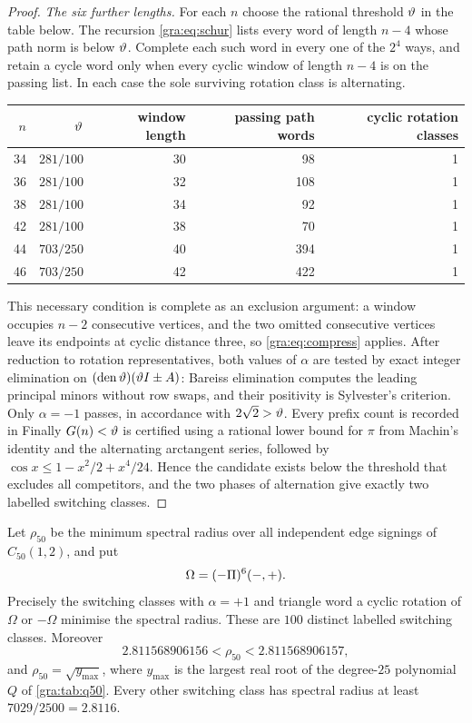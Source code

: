 \begin{proof}
\emph{The six further lengths.} For each $n$ choose the rational
threshold $\vartheta$ in the table below. The recursion
\eqref{gra:eq:schur} lists every word of length $n-4$ whose path norm is
below $\vartheta$. Complete each such word in every one of the $2^4$ ways,
and retain a cycle word only when every cyclic window of length $n-4$ is
on the passing list. In each case the sole surviving rotation class is
alternating.
\begin{center}\small\upshape
\begin{tabular}{rrrrr}
\toprule
$n$&$\vartheta$&window length&passing path words&cyclic rotation classes\\
\midrule
34&$281/100$&30&98&1\\
36&$281/100$&32&108&1\\
38&$281/100$&34&92&1\\
42&$281/100$&38&70&1\\
44&$703/250$&40&394&1\\
46&$703/250$&42&422&1\\
\bottomrule
\end{tabular}
\end{center}
This necessary condition is complete as an exclusion argument: a window
occupies $n-2$ consecutive vertices, and the two omitted consecutive
vertices leave its endpoints at cyclic distance three, so
\eqref{gra:eq:compress} applies. After reduction to rotation
representatives, both values of $\alpha$ are tested by exact integer
elimination on $(\operatorname{den}\vartheta)(\vartheta I\pm A)$: Bareiss
elimination computes the leading principal minors without row swaps, and
their positivity is Sylvester's criterion. Only $\alpha=-1$ passes, in
accordance with $2\sqrt2>\vartheta$. Every prefix count is recorded in
Finally $G(n)<\vartheta$ is certified
using a rational lower bound for $\pi$ from Machin's identity and the
alternating arctangent series, followed by
$\cos x\le1-x^2/2+x^4/24$. Hence the candidate exists below the threshold
that excludes all competitors, and the two phases of alternation give
exactly two labelled switching classes.
\end{proof}

\begin{theorem}\label{gra:thm:fifty}
Let $\rho_{50}$ be the minimum spectral radius over all independent edge
signings of $C_{50}(1,2)$, and put
\[
 \Omega=(-\Pi)^6(-,+).
\]
Precisely the switching classes with $\alpha=+1$ and triangle word a
cyclic rotation of $\Omega$ or $-\Omega$ minimise the spectral radius.
These are $100$ distinct labelled switching classes. Moreover
\[
 2.811568906156<\rho_{50}<2.811568906157,
\]
and $\rho_{50}=\sqrt{y_{\max}}$, where $y_{\max}$ is the largest real root
of the degree-$25$ polynomial $Q$ of \cref{gra:tab:q50}. Every other
switching class has spectral radius at least $7029/2500=2.8116$.
\end{theorem}

